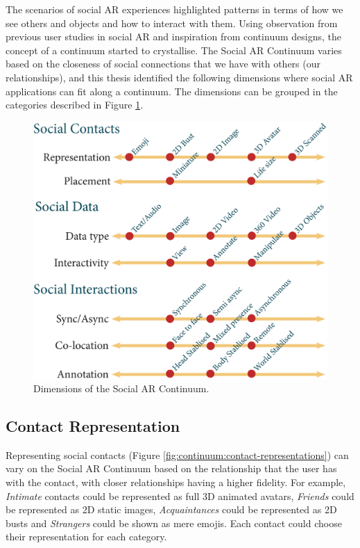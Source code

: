 The scenarios of social AR experiences highlighted patterns in terms of how we see others and objects and how to interact with them. Using observation from previous user studies in social AR and inspiration from continuum designs, the concept of a continuum started to crystallise. The Social AR Continuum varies based on the closeness of social connections that we have with others (our relationships), and this thesis identified the following dimensions where social AR applications can fit along a continuum. The dimensions can be grouped in the categories described in Figure \ref{fig:continuum:dimensions}.

\begin{figure}[h]
    \centering
    \includegraphics[width=0.8\linewidth]{images/30-continuum/continuum4_1.eps}
    \caption{Dimensions of the Social AR Continuum.}
    \label{fig:continuum:dimensions}
\end{figure}

\subsection{Contact Representation}

Representing social contacts (Figure \ref{fig:continuum:contact-representations}) can vary on the Social AR Continuum based on the relationship that the user has with the contact, with closer relationships having a higher fidelity. For example, \textit{Intimate} contacts could be represented as full 3D animated avatars, \textit{Friends} could be represented as 2D static images, \textit{Acquaintances} could be represented as 2D busts and \textit{Strangers} could be shown as mere emojis. Each contact could choose their representation for each category.

